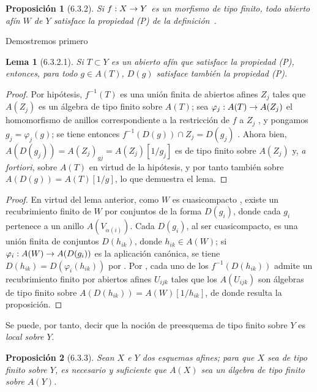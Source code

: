 \documentclass[oneside]{amsart}
\theoremstyle{ega-env-style}
\theoremstyle{ega-thm-env-style}
\newtheorem*{proposition}{Proposición}
\newtheorem*{lemma}{Lema}
\theoremstyle{ega-defn-env-style}
\renewcommand{\to}{\mathchoice{\longrightarrow}{\rightarrow}{\rightarrow}{\rightarrow}}
\newcommand{\oldpage}[2][]{{\marginnote{\normalfont{\textbf{#1}~|~#2}}}\ignorespaces}
\let\EGAOriginalLabel\label
\renewcommand{\label}[1]{\phantomsection\EGAOriginalLabel{#1}}
\newcommand{\erratum}[2][]{{#2}\marginpar{\footnotesize\textbf{Err}\textsubscript{#1}}}
\begin{document}
\begin{proposition}[6.3.2]
\label{I.6.3.2}
Si $f:X\to Y$ es un morfismo de tipo finito, todo abierto afín $W$ de $Y$ satisface la propiedad \emph{(P)} de la definición~.
\end{proposition}

Demostremos primero
\begin{lemma}[6.3.2.1]
\label{I.6.3.2.1}
Si $T\subset Y$ es un abierto afín que satisface la propiedad \emph{(P)}, entonces, para todo $g\in A(T)$, $D(g)$ satisface también la propiedad \emph{(P)}.
\end{lemma}

\begin{proof}
Por hipótesis, $f^{-1}(T)$ es una unión finita de abiertos afines $Z_j$ tales que $A(Z_j)$ es un álgebra de tipo finito sobre $A(T)$;
sea $\varphi_j:A(T)\to A(Z_j)$ el homomorfismo de anillos correspondiente a la restricción de $f$ a $Z_j$ , y pongamos $g_j=\varphi_j(g)$;
se tiene entonces $f^{-1}(D(g))\cap Z_j=D(g_j)$ .
Ahora bien, $A(D(g_j))=A(Z_j)_{gj}=A(Z_j)[1/g_j]$ es de tipo finito sobre $A(Z_j)$ y, \emph{a fortiori}, sobre $A(T)$ en virtud de la hipótesis, y por tanto también sobre $A(D(g))=A(T)[1/g]$, lo que demuestra el lema.
\end{proof}

\begin{proof}
En virtud del lema anterior, como $W$ es cuasicompacto , existe un recubrimiento finito de $W$ por conjuntos de la forma \erratum[II]{$D(g_i)$}, donde cada $g_i$ pertenece a un anillo $A(V_{\alpha(i)})$.
Cada $D(g_i)$, al ser cuasicompacto, es una unión finita de conjuntos $D(h_{ik})$, donde $h_{ik}\in A(W)$;
si $\varphi_i:A(W)\to A(D(g_i))$ es la aplicación canónica, se tiene $D(h_{ik})=D(\varphi_i(h_{ik}))$ por .
Por , cada uno de los $f^{-1}(D(h_{ik}))$ admite un recubrimiento finito por abiertos afines $U_{ijk}$ tales que los $A(U_{ijk})$ son álgebras de tipo finito sobre $A(D(h_{ik}))=A(W)[1/h_{ik}]$, de donde resulta la proposición.
\end{proof}

\oldpage[I]{145}
Se puede, por tanto, decir que la noción de preesquema de tipo finito sobre $Y$ es \emph{local sobre $Y$}.

\begin{proposition}[6.3.3]
\label{I.6.3.3}
Sean $X$ e $Y$ dos esquemas afines;
para que $X$ sea de tipo finito sobre $Y$, es necesario y suficiente que $A(X)$ sea un álgebra de tipo finito sobre $A(Y)$.
\end{proposition}
\end{document}
